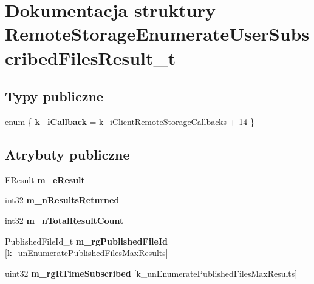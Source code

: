 \hypertarget{struct_remote_storage_enumerate_user_subscribed_files_result__t}{}\section{Dokumentacja struktury Remote\+Storage\+Enumerate\+User\+Subscribed\+Files\+Result\+\_\+t}
\label{struct_remote_storage_enumerate_user_subscribed_files_result__t}
\subsection*{Typy publiczne}
\begin{DoxyCompactItemize}
\item 
\mbox{\label{struct_remote_storage_enumerate_user_subscribed_files_result__t_afba3ff9e23f0f3d5b2d244abddf201b6}} 
enum \{ {\bfseries k\+\_\+i\+Callback} = k\+\_\+i\+Client\+Remote\+Storage\+Callbacks + 14
 \}
\end{DoxyCompactItemize}
\subsection*{Atrybuty publiczne}
\begin{DoxyCompactItemize}
\item 
\mbox{\label{struct_remote_storage_enumerate_user_subscribed_files_result__t_adcc10625e74e6d3218ff6a4832d03319}} 
E\+Result {\bfseries m\+\_\+e\+Result}
\item 
\mbox{\label{struct_remote_storage_enumerate_user_subscribed_files_result__t_a57650e55de87db77e55c7b446a183f1a}} 
int32 {\bfseries m\+\_\+n\+Results\+Returned}
\item 
\mbox{\label{struct_remote_storage_enumerate_user_subscribed_files_result__t_aedd17574dd675508deb18800788053cf}} 
int32 {\bfseries m\+\_\+n\+Total\+Result\+Count}
\item 
\mbox{\label{struct_remote_storage_enumerate_user_subscribed_files_result__t_ab50056d64ad7375e08d8702fcc4d5669}} 
Published\+File\+Id\+\_\+t {\bfseries m\+\_\+rg\+Published\+File\+Id} \mbox{[}k\+\_\+un\+Enumerate\+Published\+Files\+Max\+Results\mbox{]}
\item 
\mbox{\label{struct_remote_storage_enumerate_user_subscribed_files_result__t_a904b88434566579dd348658868188225}} 
uint32 {\bfseries m\+\_\+rg\+R\+Time\+Subscribed} \mbox{[}k\+\_\+un\+Enumerate\+Published\+Files\+Max\+Results\mbox{]}
\end{DoxyCompactItemize}


